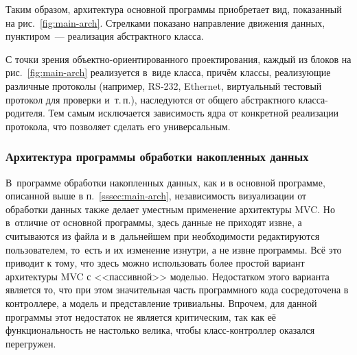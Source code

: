 \documentclass[a4paper, 14pt, titlepage]{extarticle}
\begin{document}
  Таким образом, архитектура основной программы приобретает вид, показанный на рис.~\ref{fig:main-arch}.
  Стрелками показано направление движения данных, пунктиром~--- реализация абстрактного класса.

  С точки зрения объектно-ориентированного проектирования, каждый из блоков на рис.~\ref{fig:main-arch}
  реализуется в~виде класса, причём классы, реализующие различные протоколы (например, RS-232,
  Ethernet, виртуальный тестовый протокол для проверки и~т.\,п.), наследуются от общего абстрактного
  класса-родителя. Тем самым исключается зависимость ядра от конкретной реализации протокола, что
  позволяет сделать его универсальным.

  \subsubsection{Архитектура программы обработки накопленных данных}

  В~программе обработки накопленных данных, как и в основной программе, описанной выше в
  п.~\ref{sssec:main-arch}, независимость визуализации от обработки данных также делает уместным
  применение архитектуры MVC. Но в~отличие от основной программы, здесь данные не приходят извне, а
  считываются из файла и в~дальнейшем при необходимости редактируются пользователем, то~есть и их
  изменение изнутри, а не извне программы. Всё это приводит к тому, что здесь можно использовать
  более простой вариант архитектуры MVC с <<пассивной>> моделью. Недостатком этого варианта является
  то, что при этом значительная часть программного кода сосредоточена в контроллере, а модель и
  представление тривиальны. Впрочем, для данной программы этот недостаток не является критическим,
  так как её функциональность не настолько велика, чтобы класс-контроллер оказался перегружен.
\end{document}
